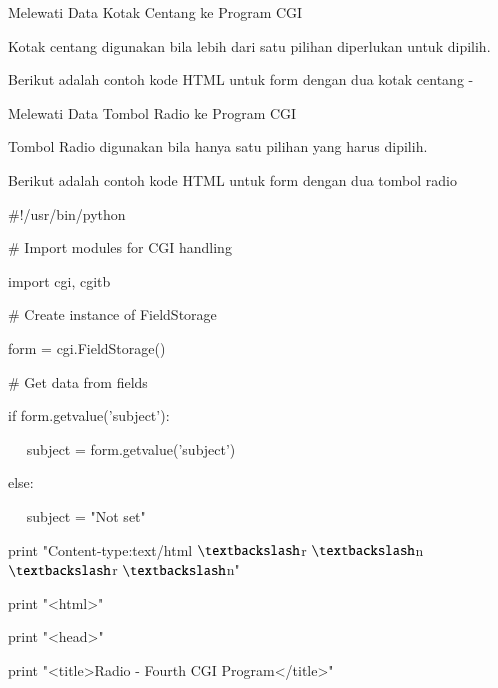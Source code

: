 \documentclass[a4paper,12pt]{report}
\begin{document}
\vspace{16pt}
\noindent 
Melewati Data Kotak Centang ke Program CGI \par
\vspace{12pt}
\noindent 
Kotak centang digunakan bila lebih dari satu pilihan diperlukan untuk dipilih. \par
\vspace{12pt}
\noindent 
Berikut adalah contoh kode HTML untuk form dengan dua kotak centang - \par
\vspace{16pt}
\noindent 
Melewati Data Tombol Radio ke Program CGI \par
\vspace{12pt}
\noindent 
Tombol Radio digunakan bila hanya satu pilihan yang harus dipilih. \par
\vspace{12pt}
\noindent 
Berikut adalah contoh kode HTML untuk form dengan dua tombol radio  \par
\vspace{12pt}
\vspace{12pt}
\noindent 
 $  \#  $!/usr/bin/python \par
\vspace{12pt}
\noindent 
 $  \#  $ Import modules for CGI handling  \par
\noindent 
import cgi, cgitb  \par
\vspace{12pt}
\noindent 
 $  \#  $ Create instance of FieldStorage  \par
\noindent 
form = cgi.FieldStorage()  \par
\vspace{12pt}
\noindent 
 $  \#  $ Get data from fields \par
\noindent 
if form.getvalue('subject'): \par
\noindent 
~~ subject = form.getvalue('subject') \par
\noindent 
else: \par
\noindent 
~~ subject = "Not set" \par
\vspace{12pt}
\noindent 
print "Content-type:text/html $  \textbackslash  $r $  \textbackslash  $n $  \textbackslash  $r $  \textbackslash  $n" \par
\noindent 
print "<html>" \par
\noindent 
print "<head>" \par
\noindent 
print "<title>Radio - Fourth CGI Program</title>" \par
\end{document}
